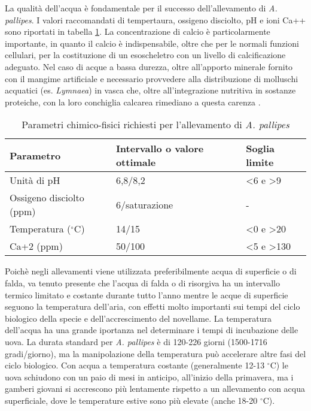 \documentclass[11pt,a4paper,italian,twoside,openany]{memoir}
\begin{document}
La qualità dell'acqua è fondamentale per il successo dell'allevamento di \emph{A. pallipes}. I valori raccomandati di tempertaura, ossigeno disciolto, pH e ioni Ca++ \cite{AA.VV. 2014} sono riportati in tabella \ref{tab_2}. La concentrazione di calcio è particolarmente importante, in quanto il calcio è indispensabile, oltre che per le normali funzioni cellulari, per la costituzione di un esoscheletro con un livello di calcificazione adeguato. Nel caso di acque a bassa durezza, oltre all'apporto minerale fornito con il mangime artificiale e necessario provvedere alla distribuzione di molluschi acquatici (es. \emph{Lymnaea}) in vasca che, oltre all'integrazione nutritiva in sostanze proteiche, con la loro conchiglia calcarea rimediano a questa carenza \cite{De Luise 2012}.

\begin{table}[]
\centering
\begin{tabular}{@{}lll@{}}
\toprule
\textbf{Parametro}       & \textbf{Intervallo o valore ottimale} & \textbf{Soglia limite}    \\ \midrule
Unità  di pH  & 6,8/8,2         & \textless 6 e \textgreater  9   \\
\rowcolor[HTML]{EFEFEF}  Ossigeno disciolto (ppm) & 6/saturazione   & -   \\
Temperatura ($^{\circ}$C)        & 14/15           & \textless 0 e \textgreater 20  \\
\rowcolor[HTML]{EFEFEF}  Ca+2 (ppm)    & 50/100          & \textless 5 e \textgreater 130 \\ \bottomrule
\end{tabular}
\caption{Parametri chimico-fisici richiesti per l'allevamento di \emph{A. pallipes}}
\label{tab_2}
\end{table}

Poichè negli allevamenti viene utilizzata preferibilmente acqua di superficie o di falda, va tenuto presente che l'acqua di falda o di risorgiva ha un intervallo termico limitato e costante durante tutto l'anno mentre le acque di superficie seguono la temperatura dell'aria, con effetti molto importanti sui tempi del ciclo biologico della specie e dell'accrescimento del novellame. La temperatura dell'acqua ha una grande iportanza nel determinare i tempi di incubazione delle uova. La durata standard per \emph{A. pallipes} è di 120-226 giorni (1500-1716 gradi/giorno), ma la manipolazione della temperatura può accelerare altre fasi del ciclo biologico. Con acqua a temperatura costante (generalmente 12-13 $^{\circ}$C) le uova schiudono con un paio di mesi in anticipo, all'inizio della primavera, ma i gamberi giovani si accrescono più lentamente rispetto a un allevamento con acqua superficiale, dove le temperature estive sono più elevate (anche 18-20 $^{\circ}$C). 
\end{document}
